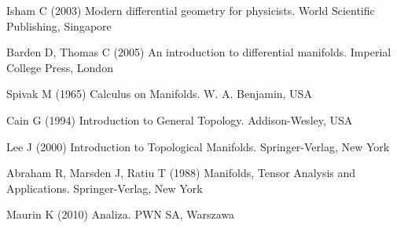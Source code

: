 
%
% 
% 
%
\begin{thebibliography}{99.}
%
%
%
 Isham C (2003)
Modern differential geometry for physicists.
World Scientific Publishing, Singapore

 Barden D, Thomas C (2005)
An introduction to differential manifolds.
Imperial College Press, London

 Spivak M (1965)
Calculus on Manifolds.
W. A. Benjamin, USA

 Cain G (1994)
Introduction to General Topology.
Addison-Wesley, USA

 Lee J (2000)
Introduction to Topological Manifolds.
Springer-Verlag, New York

 Abraham R, Marsden J, Ratiu T (1988)
Manifolds, Tensor Analysis and Applications.
Springer-Verlag, New York

 Maurin K (2010)
Analiza.
PWN SA, Warszawa

%
%

\end{thebibliography}
